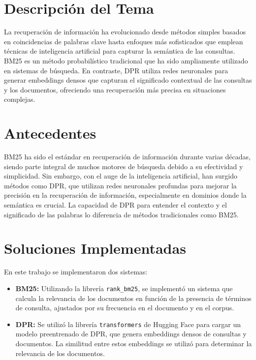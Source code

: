 \documentclass[runningheads]{llncs}
\begin{document}
\section{Descripción del Tema}
La recuperación de información ha evolucionado desde métodos simples basados en coincidencias de palabras clave hasta enfoques más sofisticados que emplean técnicas de inteligencia artificial para capturar la semántica de las consultas. BM25 es un método probabilístico tradicional que ha sido ampliamente utilizado en sistemas de búsqueda. En contraste, DPR utiliza redes neuronales para generar embeddings densos que capturan el significado contextual de las consultas y los documentos, ofreciendo una recuperación más precisa en situaciones complejas.

\section{Antecedentes}
BM25 ha sido el estándar en recuperación de información durante varias décadas, siendo parte integral de muchos motores de búsqueda debido a su efectividad y simplicidad. Sin embargo, con el auge de la inteligencia artificial, han surgido métodos como DPR, que utilizan redes neuronales profundas para mejorar la precisión en la recuperación de información, especialmente en dominios donde la semántica es crucial. La capacidad de DPR para entender el contexto y el significado de las palabras lo diferencia de métodos tradicionales como BM25.

\section{Soluciones Implementadas}
En este trabajo se implementaron dos sistemas:
\begin{itemize}
    \item \textbf{BM25:} Utilizando la librería \texttt{rank\_bm25}, se implementó un sistema que calcula la relevancia de los documentos en función de la presencia de términos de consulta, ajustados por su frecuencia en el documento y en el corpus.
    \item \textbf{DPR:} Se utilizó la librería \texttt{transformers} de Hugging Face para cargar un modelo preentrenado de DPR, que genera embeddings densos de consultas y documentos. La similitud entre estos embeddings se utilizó para determinar la relevancia de los documentos.
\end{itemize}
\end{document}

